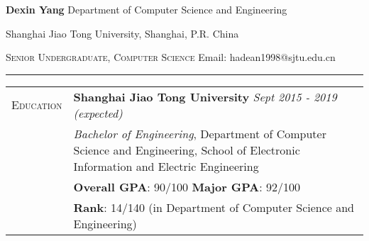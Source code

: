\documentclass{article}
\begin{document}
\pagestyle{empty}

\setlength\parindent{0em}

{\LARGE{\textbf{Dexin Yang}}} \hfill {Department of Computer Science and Engineering}

\hfill {Shanghai Jiao Tong University, Shanghai, P.R. China}


\textsc{Senior Undergraduate, Computer Science} \hfill {Email: hadean1998@sjtu.edu.cn}

\rule[0pt]{\linewidth}{1pt}

\vspace{5pt}
\renewcommand\arraystretch{1.25}
\begin{tabular}{p{2.5cm}p{16cm}}
    {\textsc{Education}} & \textbf{Shanghai Jiao Tong University} \hfill \textit{Sept 2015 - 2019 (expected)}\\
    & \textit{Bachelor of Engineering}, Department of Computer Science and Engineering, School of Electronic Information and Electric Engineering\\
    &\textbf{Overall GPA}: 90/100 \quad\quad \textbf{Major GPA}: 92/100\\
    &\textbf{Rank}: 14/140 (in Department of Computer Science and Engineering)\vspace{0.4cm}\\
    

\end{tabular}
\end{document}

